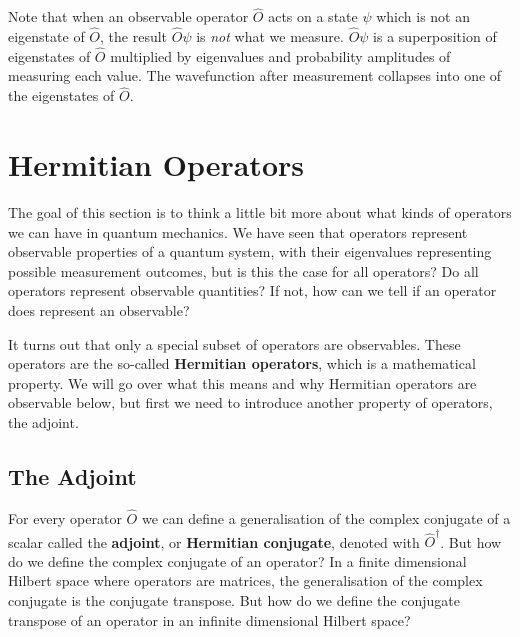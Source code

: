 \documentclass[../quantum_mechanics.tex]{subfiles}
\begin{document}
            Note that when an observable operator $\hat{O}$ acts on a state $\psi$ which is not an eigenstate of $\hat{O}$, the result $\hat{O}\psi$ is \textit{not} what we measure.
            $\hat{O}\psi$ is a superposition of eigenstates of $\hat{O}$ multiplied by eigenvalues and probability amplitudes of measuring each value.
            The wavefunction after measurement collapses into one of the eigenstates of $\hat{O}$.


    \section{Hermitian Operators}\label{sec:hermitian-operators}
        The goal of this section is to think a little bit more about what kinds of operators we can have in quantum mechanics.
        We have seen that operators represent observable properties of a quantum system, with their eigenvalues representing possible measurement outcomes, but is this the case for all operators?
        Do all operators represent observable quantities?
        If not, how can we tell if an operator does represent an observable?

        It turns out that only a special subset of operators are observables.
        These operators are the so-called \textbf{Hermitian operators}, which is a mathematical property.
        We will go over what this means and why Hermitian operators are observable below, but first we need to introduce another property of operators, the adjoint. 
        
        \subsection{The Adjoint}\label{sec:hermitian-operators:subsec:the-adjoint}
            For every operator $\hat{O}$ we can define a generalisation of the complex conjugate of a scalar called the \textbf{adjoint}, or \textbf{Hermitian conjugate}, denoted with $\hat{O}^\dagger$.
            But how do we define the complex conjugate of an operator?
            In a finite dimensional Hilbert space where operators are matrices, the generalisation of the complex conjugate is the conjugate transpose.
            But how do we define the conjugate transpose of an operator in an infinite dimensional Hilbert space?
\end{document}
